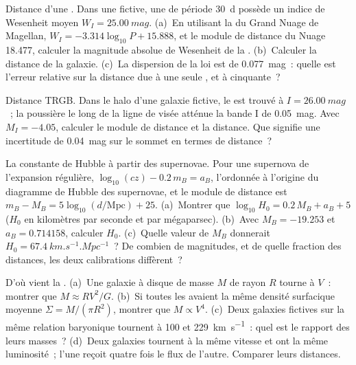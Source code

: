 \begin{exercise}[$\star\star$]\label{exo:b3:milky-way-galaxies:7}
Distance d'une . Dans une  fictive, une  de période
\qty{30}{d} possède un indice de Wesenheit moyen $W_I = \qty{25.00}{mag}$.
(a)~En utilisant la  du Grand Nuage de Magellan,
$W_I = -3.314\log_{10}P + 15.888$, et le module de distance du Nuage
18.477, calculer la magnitude absolue de Wesenheit de la . (b)~Calculer
la distance de la galaxie. (c)~La dispersion de la loi est de \qty{0.077}{mag}~: quelle est
l'erreur relative sur la distance due à une seule , et à cinquante~?
\end{exercise}

\begin{exercise}[$\star\star$]\label{exo:b3:milky-way-galaxies:8}
Distance TRGB. Dans le halo d'une galaxie fictive, le  est trouvé à $I = \qty{26.00}{mag}$~; la poussière le long de la ligne de
visée atténue la bande I de \qty{0.05}{mag}. Avec $M_I = -4.05$, calculer le module de
distance et la distance. Que signifie une incertitude de
\qty{0.04}{mag} sur le sommet en termes de distance~?
\end{exercise}

\begin{exercise}[$\star\star$]\label{exo:b3:milky-way-galaxies:9}
La constante de Hubble à partir des supernovae. Pour une supernova de l'expansion régulière,
$\log_{10}(cz) - 0.2\,m_B = a_B$, l'ordonnée à l'origine du
diagramme de Hubble des supernovae, et le module de distance est
$m_B - M_B = 5\log_{10}(d/\mathrm{Mpc}) + 25$. (a)~Montrer que
$\log_{10}H_0 = 0.2\,M_B + a_B + 5$ ($H_0$ en kilomètres par seconde et par
mégaparsec). (b)~Avec $M_B = -19.253$ et $a_B = 0.714158$, calculer $H_0$.
(c)~Quelle valeur de $M_B$ donnerait $H_0 = \qty{67.4}{km.s^{-1}.Mpc^{-1}}$~? De combien
de magnitudes, et de quelle fraction des distances, les deux
calibrations diffèrent~?
\end{exercise}

\begin{exercise}[$\star\star\star$]\label{exo:b3:milky-way-galaxies:10}
D'où vient la . (a)~Une galaxie à disque de masse $M$
de rayon $R$ tourne à $V$~: montrer que $M \approx RV^2/G$. (b)~Si toutes les
 avaient la même densité surfacique moyenne $\Sigma = M/(\pi R^2)$,
montrer que $M \propto V^4$. (c)~Deux galaxies fictives sur la même relation baryonique
tournent à 100 et \qty{229}{km.s^{-1}}~: quel est le rapport des
leurs masses~? (d)~Deux galaxies tournent à la même vitesse et ont la même
luminosité~; l'une reçoit quatre fois le flux de l'autre. Comparer leurs
distances.
\end{exercise}

